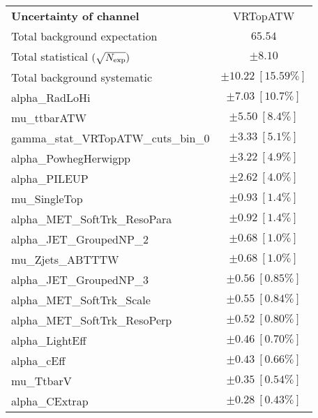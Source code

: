 
\begin{table}
\begin{center}
\setlength{\tabcolsep}{0.0pc}
\begin{tabular*}{\textwidth}{@{\extracolsep{\fill}}lc}
\noalign{\smallskip}\hline\noalign{\smallskip}
{\bf Uncertainty of channel}                                    & VRTopATW            \\
\noalign{\smallskip}\hline\noalign{\smallskip}
Total background expectation             &  $65.54$       \\
\noalign{\smallskip}\hline\noalign{\smallskip}
Total statistical $(\sqrt{N_{\rm exp}})$              & $\pm 8.10$       \\
Total background systematic               & $\pm 10.22\ [15.59\%] $             \\
\noalign{\smallskip}\hline\noalign{\smallskip}
\noalign{\smallskip}\hline\noalign{\smallskip}
alpha\_RadLoHi         & $\pm 7.03\ [10.7\%] $       \\
mu\_ttbarATW         & $\pm 5.50\ [8.4\%] $       \\
gamma\_stat\_VRTopATW\_cuts\_bin\_0         & $\pm 3.33\ [5.1\%] $       \\
alpha\_PowhegHerwigpp         & $\pm 3.22\ [4.9\%] $       \\
alpha\_PILEUP         & $\pm 2.62\ [4.0\%] $       \\
mu\_SingleTop         & $\pm 0.93\ [1.4\%] $       \\
alpha\_MET\_SoftTrk\_ResoPara         & $\pm 0.92\ [1.4\%] $       \\
alpha\_JET\_GroupedNP\_2         & $\pm 0.68\ [1.0\%] $       \\
mu\_Zjets\_ABTTTW         & $\pm 0.68\ [1.0\%] $       \\
alpha\_JET\_GroupedNP\_3         & $\pm 0.56\ [0.85\%] $       \\
alpha\_MET\_SoftTrk\_Scale         & $\pm 0.55\ [0.84\%] $       \\
alpha\_MET\_SoftTrk\_ResoPerp         & $\pm 0.52\ [0.80\%] $       \\
alpha\_LightEff         & $\pm 0.46\ [0.70\%] $       \\
alpha\_cEff         & $\pm 0.43\ [0.66\%] $       \\
mu\_TtbarV         & $\pm 0.35\ [0.54\%] $       \\
alpha\_CExtrap         & $\pm 0.28\ [0.43\%] $       \\

\end{tabular*}
\end{center}
\end{table}
